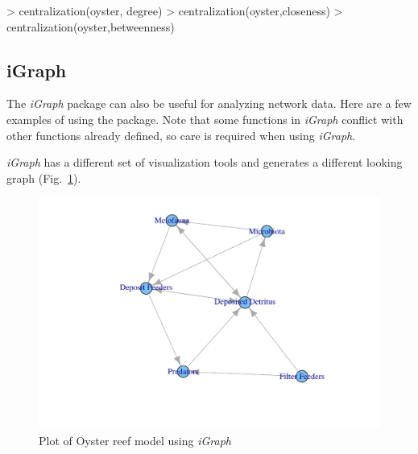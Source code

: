 \documentclass[article]{jss}
\begin{document}
\begin{Schunk}
\begin{Sinput}
> centralization(oyster, degree)
> centralization(oyster,closeness)
> centralization(oyster,betweenness)
\end{Sinput}
\end{Schunk}

\subsection{iGraph}
The \textit{iGraph} package can also be useful for analyzing network
data.  Here are a few examples of using the package.  Note that some
functions in \textit{iGraph} conflict with other functions already defined, so
care is required when using \textit{iGraph}.

\begin{Schunk}
\end{Schunk}

\textit{iGraph} has a different set of visualization tools and
generates a different looking graph (Fig.~\ref{fig:igraph}).

\begin{figure}
\center
\includegraphics[]{enaR-vignette-054}
\caption{Plot of Oyster reef model using \textit{iGraph}}\label{fig:igraph}
\end{figure}
\end{document}
